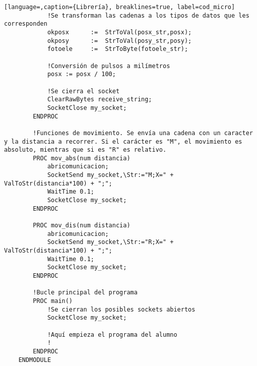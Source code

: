 \begin{lstlisting}[language=,caption={Librería}, breaklines=true, label=cod_micro]
            !Se transforman las cadenas a los tipos de datos que les corresponden
            okposx      :=  StrToVal(posx_str,posx);
            okposy      :=  StrToVal(posy_str,posy);
            fotoele     :=  StrToByte(fotoele_str);
            
            !Conversión de pulsos a milímetros
            posx := posx / 100;
    
            !Se cierra el socket
            ClearRawBytes receive_string;
            SocketClose my_socket;
        ENDPROC
    
        !Funciones de movimiento. Se envía una cadena con un caracter y la distancia a recorrer. Si el carácter es "M", el movimiento es absoluto, mientras que si es "R" es relativo.
        PROC mov_abs(num distancia)
            abricomunicacion;
            SocketSend my_socket,\Str:="M;X=" + ValToStr(distancia*100) + ";";
            WaitTime 0.1;
            SocketClose my_socket;
        ENDPROC
        
        PROC mov_dis(num distancia)
            abricomunicacion;
            SocketSend my_socket,\Str:="R;X=" + ValToStr(distancia*100) + ";";
            WaitTime 0.1;
            SocketClose my_socket;
        ENDPROC

        !Bucle principal del programa
        PROC main()
            !Se cierran los posibles sockets abiertos
            SocketClose my_socket;
            
            !Aquí empieza el programa del alumno
            !
        ENDPROC
    ENDMODULE
\end{lstlisting}
